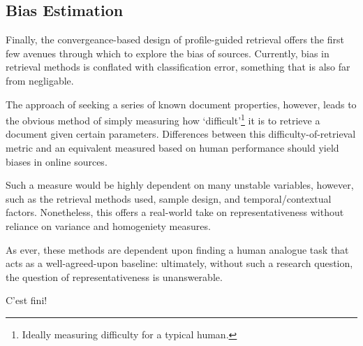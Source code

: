 \subsection{Bias Estimation}
Finally, the convergeance-based design of profile-guided retrieval offers the first few avenues through which to explore the bias of sources.  Currently, bias in retrieval methods is conflated with classification error, something that is also far from negligable.

The approach of seeking a series of known document properties, however, leads to the obvious method of simply measuring how `difficult'\footnote{Ideally measuring difficulty for a typical human.} it is to retrieve a document given certain parameters.  Differences between this difficulty-of-retrieval metric and an equivalent measured based on human performance should yield biases in online sources.

Such a measure would be highly dependent on many unstable variables, however, such as the retrieval methods used, sample design, and temporal/contextual factors.  Nonetheless, this offers a real-world take on representativeness without reliance on variance and homogeniety measures.

As ever, these methods are dependent upon finding a human analogue task that acts as a well-agreed-upon baseline: ultimately, without such a research question, the question of representativeness is unanswerable.




\begin{center}
\vfill
{\selectfont C'est fini!}
\vfill
\end{center}




